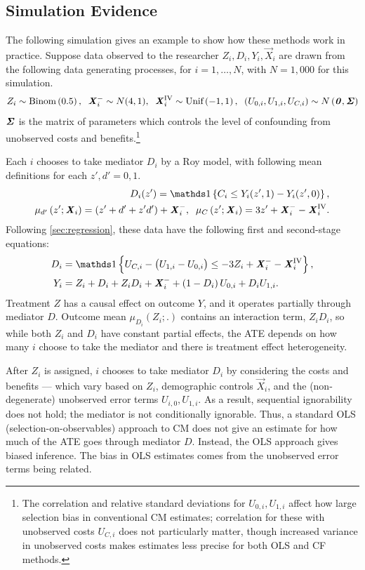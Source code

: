 \subsection{Simulation Evidence}
\label{sec:simulations}
The following simulation gives an example to show how these methods work in practice.
Suppose data observed to the researcher $Z_i, D_i, Y_i, \vec X_i$ are drawn from the following data generating processes, for $i = 1, \hdots, N$, with 
$N = 1,000$ for this simulation.
\[ Z_i \sim \text{Binom}\left(0.5 \right),
    \;\; \boldsymbol{\mathit{X}}_i^- \sim N(4, 1),
    \;\; \boldsymbol{\mathit{X}}_i^{\text{IV}} \sim \text{Unif}\left( -1, 1 \right),
    \;\; \left( U_{0,i}, U_{1,i}, U_{C,i} \right) \sim
    N\left( \boldsymbol{\mathit{0}}, \boldsymbol{\mathit{\Sigma}} \right) \]
$\boldsymbol{\mathit{\Sigma}}$ is the matrix of parameters which controls the level of confounding from unobserved costs and benefits.\footnote{
    The correlation and relative standard deviations for $U_{0,i}, U_{1,i}$ affect how large selection bias in conventional CM estimates; correlation for these with unobserved costs $U_{C,i}$ does not particularly matter, though increased variance in unobserved costs makes estimates less precise for both OLS and CF methods.
}

Each $i$ chooses to take mediator $D_i$ by a Roy model, with following mean definitions for each $z', d' = 0, 1$.
\begin{align*}
    D_i(z') = \indicator{C_i \leq Y_i(z', 1) - Y_i(z', 0)},  \\
    \mu_{d'}\left(z' ; \vec X_i \right) = \left( z' + d' + z' d' \right) + \vec X_i^-,
    \;\; \mu_{C}\left(z' ; \vec X_i \right) = 3z' + \vec X_i^- - \vec X_i^{\text{IV}}.
\end{align*}
Following \autoref{sec:regression}, these data have the following first and second-stage equations:
\begin{align*}
    D_i &= \indicator{U_{C,i} - \big( U_{1,i} - U_{0,i} \big)
    \leq -3Z_i + \vec X_i^- - \vec X_i^{\text{IV}}},  \\
    Y_i &= Z_i + D_i + Z_i D_i + \vec X_i^-
        + \left( 1 - D_i \right) U_{0,i} + D_i U_{1,i}.
\end{align*}
Treatment $Z$ has a causal effect on outcome $Y$, and it operates partially through mediator $D$.
Outcome mean $\mu_{D_i}(Z_i;.)$ contains an interaction term, $Z_i D_i$, so while both $Z_i$ and $D_i$ have constant partial effects, the ATE depends on how many $i$ choose to take the mediator and there is treatment effect heterogeneity.

After $Z_i$ is assigned, $i$ chooses to take mediator $D_i$ by considering the costs and benefits --- which vary based on $Z_i$, demographic controls $\vec X_i$, and the (non-degenerate) unobserved error terms $U_{i,0}, U_{1,i}$.
As a result, sequential ignorability does not hold; the mediator is not conditionally ignorable.
Thus, a standard OLS (selection-on-observables) approach to CM does not give an estimate for how much of the ATE goes through mediator $D$.
Instead, the OLS approach gives biased inference.
The bias in OLS estimates comes from the unobserved error terms being related.

